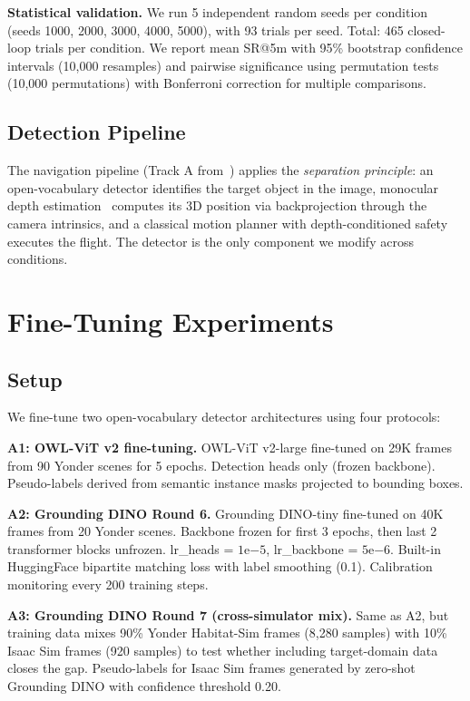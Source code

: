 \documentclass{article}
\begin{document}
\textbf{Statistical validation.} We run 5 independent random seeds per condition (seeds 1000, 2000, 3000, 4000, 5000), with 93 trials per seed. Total: 465 closed-loop trials per condition. We report mean SR@5m with 95\% bootstrap confidence intervals (10,000 resamples) and pairwise significance using permutation tests (10,000 permutations) with Bonferroni correction for multiple comparisons.

\subsection{Detection Pipeline}

The navigation pipeline (Track A from~\cite{anon2026closing}) applies the \textit{separation principle}: an open-vocabulary detector identifies the target object in the image, monocular depth estimation~\cite{yang2024depth} computes its 3D position via backprojection through the camera intrinsics, and a classical motion planner with depth-conditioned safety executes the flight. The detector is the only component we modify across conditions.

\section{Fine-Tuning Experiments}

\subsection{Setup}

We fine-tune two open-vocabulary detector architectures using four protocols:

\textbf{A1: OWL-ViT v2 fine-tuning.} OWL-ViT v2-large fine-tuned on 29K frames from 90 Yonder scenes for 5 epochs. Detection heads only (frozen backbone). Pseudo-labels derived from semantic instance masks projected to bounding boxes.

\textbf{A2: Grounding DINO Round 6.} Grounding DINO-tiny fine-tuned on 40K frames from 20 Yonder scenes. Backbone frozen for first 3 epochs, then last 2 transformer blocks unfrozen. lr\_heads = $1\mathrm{e}{-5}$, lr\_backbone = $5\mathrm{e}{-6}$. Built-in HuggingFace bipartite matching loss with label smoothing (0.1). Calibration monitoring every 200 training steps.

\textbf{A3: Grounding DINO Round 7 (cross-simulator mix).} Same as A2, but training data mixes 90\% Yonder Habitat-Sim frames (8,280 samples) with 10\% Isaac Sim frames (920 samples) to test whether including target-domain data closes the gap. Pseudo-labels for Isaac Sim frames generated by zero-shot Grounding DINO with confidence threshold 0.20.
\end{document}
